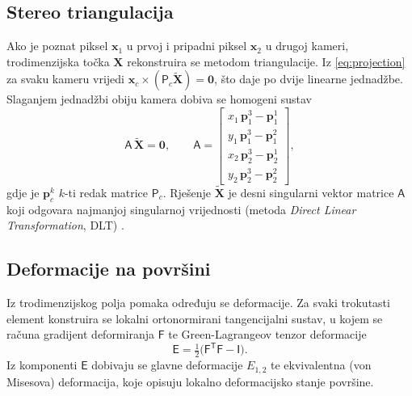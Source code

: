 \subsection{Stereo triangulacija}

Ako je poznat piksel $\mathbf{x}_1$ u prvoj i pripadni piksel $\mathbf{x}_2$ u drugoj
kameri, trodimenzijska točka $\mathbf{X}$ rekonstruira se metodom triangulacije. Iz
\eqref{eq:projection} za svaku kameru vrijedi $\mathbf{x}_c \times (\mathsf{P}_c
\tilde{\mathbf{X}})=\mathbf{0}$, što daje po dvije linearne jednadžbe. Slaganjem
jednadžbi obiju kamera dobiva se homogeni sustav
\begin{equation}
  \mathsf{A}\,\tilde{\mathbf{X}} = \mathbf{0}, \qquad
  \mathsf{A} =
  \begin{bmatrix}
    x_1\,\mathbf{p}_1^{3} - \mathbf{p}_1^{1} \\
    y_1\,\mathbf{p}_1^{3} - \mathbf{p}_1^{2} \\
    x_2\,\mathbf{p}_2^{3} - \mathbf{p}_2^{1} \\
    y_2\,\mathbf{p}_2^{3} - \mathbf{p}_2^{2}
  \end{bmatrix},
  \label{eq:dlt}
\end{equation}
gdje je $\mathbf{p}_c^{k}$ $k$-ti redak matrice $\mathsf{P}_c$. Rješenje
$\tilde{\mathbf{X}}$ je desni singularni vektor matrice $\mathsf{A}$ koji odgovara
najmanjoj singularnoj vrijednosti (metoda \textit{Direct Linear Transformation}, DLT)
\cite{hartley2004}.

\subsection{Deformacije na površini}

Iz trodimenzijskog polja pomaka određuju se deformacije. Za svaki trokutasti element
konstruira se lokalni ortonormirani tangencijalni sustav, u kojem se računa gradijent
deformiranja $\mathsf{F}$ te Green-Lagrangeov tenzor deformacije
\begin{equation}
  \mathsf{E} = \tfrac{1}{2}\big(\mathsf{F}^{\mathsf{T}}\mathsf{F} - \mathsf{I}\big).
  \label{eq:green-lagrange}
\end{equation}
Iz komponenti $\mathsf{E}$ dobivaju se glavne deformacije $E_{1,2}$ te ekvivalentna
(von Misesova) deformacija, koje opisuju lokalno deformacijsko stanje površine.
